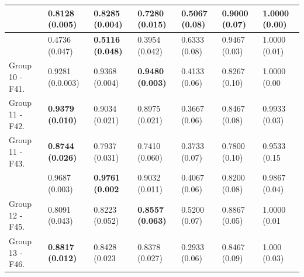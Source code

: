 \begin{center}
\begin{table}[!t]
\begin{tabular}{ccccccc}
		\rowcolor[gray]{.85}  \multicolumn{1}{|l|}{Group 12 - F39.}  & \multicolumn{1}{l}{0.8128 (0.005)} & \multicolumn{1}{l}{\textbf{0.8285 (0.004)}} & \multicolumn{1}{l|}{0.7280 (0.015)}  		& \multicolumn{1}{l}{0.5067 (0.08)} & \multicolumn{1}{l}{0.9000 (0.07)} & \multicolumn{1}{l|}{1.0000 (0.00)} \\
		\hline
		\rowcolor[gray]{.85}  \multicolumn{1}{|l|}{Group 12 - F40.}              & \multicolumn{1}{l}{0.4736 (0.047)} & \multicolumn{1}{l}{\textbf{0.5116 (0.048)}} & \multicolumn{1}{l|}{0.3954 (0.042)}  		& \multicolumn{1}{l}{0.6333 (0.08)} & \multicolumn{1}{l}{0.9467 (0.03)} & \multicolumn{1}{l|}{1.0000 (0.01)}  \\ \hline
		\multicolumn{1}{|l|}{Group 10 - F41.}  & \multicolumn{1}{l}{0.9281 (0.0.003)} & \multicolumn{1}{l}{0.9368 (0.004)} & \multicolumn{1}{l|}{\textbf{0.9480 (0.003)}}  		& \multicolumn{1}{l}{0.4133 (0.06)} & \multicolumn{1}{l}{0.8267 (0.10)} & \multicolumn{1}{l|}{1.0000 (0.00} \\ \hline
		\multicolumn{1}{|l|}{Group 11 - F42.}              & \multicolumn{1}{l}{\textbf{0.9379 (0.010)}} & \multicolumn{1}{l}{0.9034 (0.021)} & \multicolumn{1}{l|}{0.8975 (0.021)}  		& \multicolumn{1}{l}{0.3667 (0.06)} & \multicolumn{1}{l}{0.8467 (0.08)} & \multicolumn{1}{l|}{0.9933 (0.03)}  \\ \hline
		\multicolumn{1}{|l|}{Group 11 - F43.}  & \multicolumn{1}{l}{\textbf{0.8744 (0.026)}} & \multicolumn{1}{l}{0.7937 (0.031)} & \multicolumn{1}{l|}{0.7410 (0.060)}  		& \multicolumn{1}{l}{0.3733 (0.07)} & \multicolumn{1}{l}{0.7800 (0.10)} & \multicolumn{1}{l|}{0.9533 (0.15} \\ \hline
		\rowcolor[gray]{.85}  \multicolumn{1}{|l|}{Group 12 - F44.}              & \multicolumn{1}{l}{0.9687 (0.003)} & \multicolumn{1}{l}{\textbf{0.9761 (0.002}} & \multicolumn{1}{l|}{0.9032 (0.011)}  		& \multicolumn{1}{l}{0.4067 (0.06)} & \multicolumn{1}{l}{0.8200 (0.08)} & \multicolumn{1}{l|}{0.9867 (0.04)} \\ \hline
		\multicolumn{1}{|l|}{Group 12 - F45.}  & \multicolumn{1}{l}{0.8091 (0.043)} & \multicolumn{1}{l}{0.8223 (0.052)} & \multicolumn{1}{l|}{\textbf{0.8557 (0.063)}}  		& \multicolumn{1}{l}{0.5200 (0.07)} & \multicolumn{1}{l}{0.8867 (0.05)} & \multicolumn{1}{l|}{1.0000 (0.01} \\ \hline
		\multicolumn{1}{|l|}{Group 13 - F46.}              & \multicolumn{1}{l}{\textbf{0.8817 (0.012)}} & \multicolumn{1}{l}{0.8428 (0.023} & \multicolumn{1}{l|}{0.8378 (0.027)}  		& \multicolumn{1}{l}{0.2933 (0.06)} & \multicolumn{1}{l}{0.8467 (0.09)} & \multicolumn{1}{l|}{1.000 (0.03)}  \\ \hline

\end{tabular}
\end{table}
\end{center}

